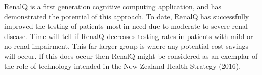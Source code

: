 \documentclass[11pt]{article}
\begin{document}
RenalQ is a first generation cognitive computing application, and has demonstrated the potential of this approach. To date, RenalQ has successfully improved the testing of patients most in need due to moderate to severe renal disease. Time will tell if RenalQ decreases testing rates in patients with mild or no renal impairment. This far larger group is where any potential cost savings will occur. If this does occur then RenalQ might be considered as an exemplar of the role of technology intended in the New Zealand Health Strategy (2016).





\end{document}
